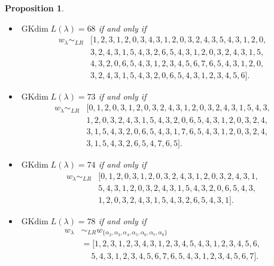 \documentclass[reqno,12pt]{amsart}
\numberwithin{equation}{section}
\theoremstyle{plain}
\newtheorem{Prop}[Thm]{Proposition}
\theoremstyle{definition}
\newcommand{\gkd}{\operatorname{GKdim}}
\begin{document}
\begin{Prop}
\begin{itemize}
\item[(7)] $\gkd L(\lambda)=68$ if and only if \begin{align*}
          w_{\lambda}\sim_{LR} &  
      [1, 2, 3, 1, 2, 0, 3, 4, 3, 1, 2, 0, 3, 2, 4, 3, 5, 4, 3, 1, 2, 0,  \\& 3, 2, 4, 3, 1, 5, 4, 3, 2, 6, 5, 4, 3, 1, 2, 0, 3, 2, 4, 3, 1, 5,  \\& 4, 3, 2, 0, 6, 5, 4, 3, 1, 2, 3, 4, 5, 6, 7, 6, 5, 4, 3, 1, 2, 0,  \\&3, 2, 4, 3, 1, 5, 4, 3, 2, 0, 6, 5, 4, 3, 1, 2, 3, 4, 5, 6].
\end{align*}
\item[(8)] $\gkd L(\lambda)=73$ if and only if \begin{align*}
          w_{\lambda}\sim_{LR}   &
      [0, 1, 2, 0, 3, 1, 2, 0, 3, 2, 4, 3, 1, 2, 0, 3, 2, 4, 3, 1, 5, 4, 3, \\& 1,  2, 0, 3, 2, 4, 3, 1, 5, 4, 3, 2, 0, 6, 5, 4, 3, 1, 2, 0, 3, 2, 4,  \\&3, 1, 5, 4, 3, 2, 0, 6, 5, 4, 3, 1, 7, 6, 5, 4, 3, 1, 2, 0, 3, 2, 4, \\&3, 1, 5,  4, 3, 2, 6, 5, 4, 7, 6, 5].
\end{align*}

\item[(9)] $\gkd L(\lambda)=74$ if and only if \begin{align*}
          w_{\lambda}\sim_{LR}   &
      [0, 1, 2, 0, 3, 1, 2, 0, 3, 2, 4, 3, 1, 2, 0, 3, 2, 4, 3, 1, \\& 5, 4, 3, 1, 2, 0, 3, 2, 4, 3, 1, 5, 4, 3, 2, 0, 6, 5, 4, 3,   \\&1, 2, 0, 3, 2, 4, 3, 1, 5, 4, 3, 2, 6, 5, 4, 3, 1].
\end{align*}

\item[(10)] $\gkd L(\lambda)=78$ if and only if \begin{align*}
          w_{\lambda}&\sim_{LR} w_{\{\alpha_2,\alpha_3,\alpha_4,\alpha_5,\alpha_6,\alpha_7,\alpha_8\}}\\  
           &=[1, 2, 3, 1, 2, 3, 4, 3, 1, 2, 3, 4, 5, 4, 3, 1, 2, 3, 4, 5, 6,\\
           & \ \quad 5, 4, 3, 1, 2, 3, 4, 5, 6, 7, 6, 5, 4, 3, 1, 2, 3, 4, 5, 6, 7].\\          
      \end{align*}
      


\end{itemize}
\end{Prop}
\end{document}
